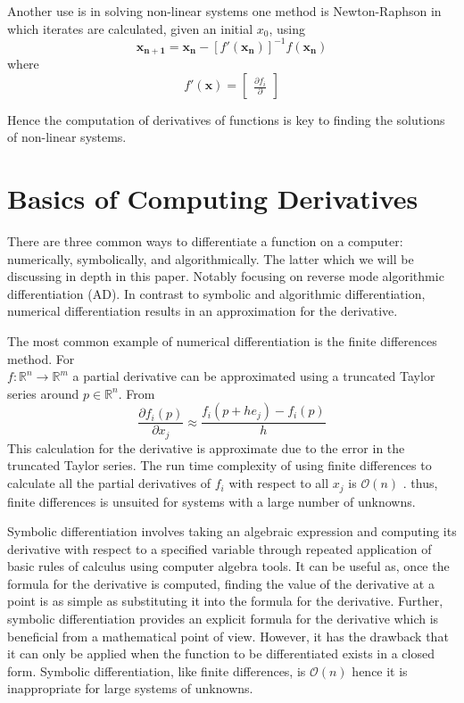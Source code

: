 \documentclass{article}
\begin{document}
Another use is in solving non-linear systems one method is Newton-Raphson in which iterates are calculated, given an initial $x_0$, using
\begin{equation}
\mathbf{x_{n+1}} = \mathbf{x_n} - [f'(\mathbf{x_n})]^{-1}f(\mathbf{x_n})
\end{equation}
where
\begin{equation}
    f'(\mathbf{x}) = \begin{bmatrix}
        \frac{\partial f_i}{\partial }
    \end{bmatrix}
\end{equation}
 
Hence the computation of derivatives of functions is key to finding the solutions of non-linear systems.

\section{Basics of Computing Derivatives}

There are three common ways to differentiate a function on a computer: numerically, symbolically, and algorithmically. The latter which we will be discussing in depth in this paper. Notably focusing on reverse mode algorithmic differentiation (AD). In contrast to symbolic and algorithmic differentiation, numerical differentiation results in an approximation for the derivative.

The most common example of numerical differentiation is the finite differences method. For \\ $f: \mathbb{R}^n \longrightarrow \mathbb{R}^m$ a partial derivative can be approximated using a truncated Taylor series around $p \in \mathbb{R}^n$. From \cite{chem}
\begin{equation*}
    \frac{\partial f_i (p)}{\partial x_j} \approx \frac{f_i(p+he_j) - f_i(p)}{h}
\end{equation*}
This calculation for the derivative is approximate due to the error in the truncated Taylor series. The run time complexity of using finite differences to calculate all the partial derivatives of $f_i$ with respect to all $x_j$ is $\mathcal{O}(n)$ \cite{dhamarticle}. thus, finite differences is unsuited for systems with a large number of unknowns.

Symbolic differentiation involves taking an algebraic expression and computing its derivative with respect to a specified variable through repeated application of basic rules of calculus using computer algebra tools. It can be useful as, once the formula for the derivative is computed, finding the value of the derivative at a point is as simple as substituting it into the formula for the derivative.  Further, symbolic differentiation provides an explicit formula for the derivative which is beneficial from a mathematical point of view. However, it has the drawback that it can only be applied when the function to be differentiated exists in a closed form. Symbolic differentiation, like finite differences, is $\mathcal{O}(n)$ \cite{chem} hence it is inappropriate for large systems of unknowns.
\end{document}
